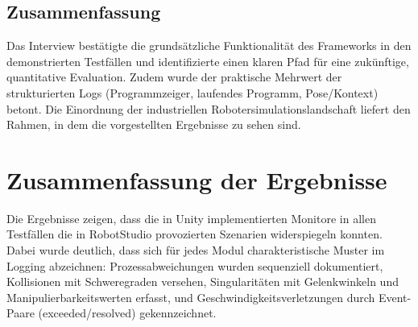 \subsection{Zusammenfassung}

Das Interview bestätigte die grundsätzliche
Funktionalität des Frameworks in den demonstrierten Testfällen und
identifizierte einen klaren Pfad für eine zukünftige, quantitative Evaluation.
Zudem wurde der praktische Mehrwert der strukturierten Logs (Programmzeiger,
laufendes Programm, Pose/Kontext) betont. Die Einordnung der industriellen
Robotersimulationslandschaft liefert den Rahmen, in dem die
vorgestellten Ergebnisse zu
sehen sind.

\section{Zusammenfassung der Ergebnisse}

Die Ergebnisse zeigen, dass die in Unity implementierten Monitore in allen
Testfällen die in RobotStudio provozierten Szenarien widerspiegeln konnten.
Dabei wurde deutlich, dass sich für jedes Modul charakteristische Muster im
Logging abzeichnen: Prozessabweichungen wurden sequenziell dokumentiert,
Kollisionen mit Schweregraden versehen, Singularitäten mit Gelenkwinkeln und
Manipulierbarkeitswerten erfasst, und Geschwindigkeitsverletzungen durch
Event-Paare (exceeded/resolved) gekennzeichnet.\\

